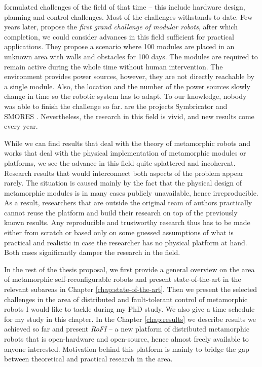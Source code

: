 \textcite{4141032} formulated challenges of the field of that time -- this
include hardware design, planning and control challenges. Most of the challenges
withstands to date. Few years later, \textcite{DBLP:journals/corr/abs-1108-5543}
propose the \emph{first grand challenge of modular robots}, after which
completion, we could consider advances in this field sufficient for practical
applications. They propose a scenario where 100 modules are placed in an unknown
area with walls and obstacles for 100 days. The modules are required to remain
active during the whole time without human intervention. The environment
provides power sources, however, they are not directly reachable by a single
module. Also, the location and the number of the power sources slowly change in
time so the robotic system has to adapt. To our knowledge, nobody was able to
finish the challenge so far.  are the projects Symbricator \textcite{DBLP:conf/syscon/LeviMRKVSLC14} and
SMORES \textcite{DBLP:journals/arobots/JingTYK18}. Nevertheless, the research in
this field is vivid, and new results come every year.

While we can find results that deal with the theory of metamorphic robots and
works that deal with the physical implementation of metamorphic modules or
platforms, we see the advance in this field quite splattered and incoherent.
Research results that would interconnect both aspects of the problem appear
rarely. The situation is caused mainly by the fact that the physical design of
metamorphic modules is in many cases publicly unavailable, hence irreproducible.
As a result, researchers that are outside the original team of authors
practically cannot reuse the platform and build their research on top of the
previously known results.  Any reproducible and trustworthy research thus has to
be made either from scratch or based only on some guessed assumptions of what is
practical and realistic in case the researcher has no physical platform at hand.
Both cases significantly damper the research in the field.

In the rest of the thesis proposal, we first provide a general overview on the
area of metamorphic self-reconfigurable robots and present state-of-the-art in
the relevant subareas in Chapter \ref{chap:state-of-the-art}. Then we present
the selected challenges in the area of distributed and fault-tolerant control of
metamorphic robots I would like to tackle during my PhD study. We also give a
time schedule for my study in this chapter. In the Chapter \ref{chap:results} we
describe results we achieved so far and present \emph{RoFI} -- a new platform of
distributed metamorphic robots that is open-hardware and open-source, hence
almost freely available to anyone interested. Motivation behind this platform is
mainly to bridge the gap between theoretical and practical research in the
area.
